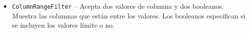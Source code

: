 \documentclass[14pt]{beamer}
\begin{document}
\begin{frame}
\begin{itemize}
\begin{frame}
\begin{itemize}


\item {\tt ColumnRangeFilter} -- Acepta dos valores de columna y dos
  booleanos. Muestra las columnas que están entre los valores. Los
  booleanos especifican si se incluyen los valores límite o no.


\end{itemize}
\end{frame}


\end{itemize}
\end{frame}
\end{document}
